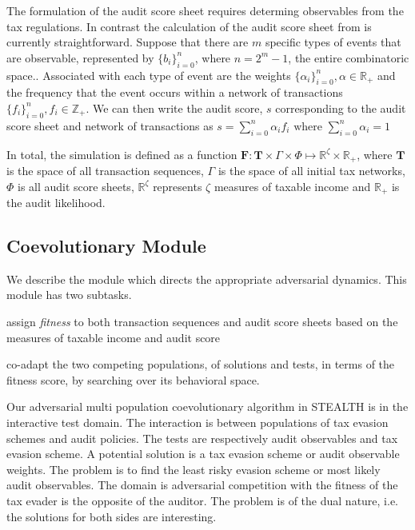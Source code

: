 The formulation of the audit score sheet requires determing
observables from the tax regulations. In contrast the calculation of
the audit score sheet from is currently straightforward. Suppose that
there are $m$ specific types of events that are observable,
represented by $\{b_i\}_{i=0}^n$, where $n = 2^m - 1$, the entire
combinatoric space.. Associated with each type of event are the
weights $\{\alpha_i\}_{i=0}^n, \alpha \in \mathbb{R}_+$ and the
frequency that the event occurs within a network of transactions
$\{f_i\}_{i=0}^n, f_i \in \mathbb{Z}_+$. We can then write the audit
score, $s$ corresponding to the audit score sheet and network of
transactions as $s = \sum_{i=0}^n \alpha_i f_i \text{ where }
\sum_{i=0}^n \alpha_i = 1$

In total, the simulation is defined as a function $\textbf{F} :
\textbf{T} \times \Gamma \times \Phi \mapsto \mathbb{R}^{\zeta} \times
\mathbb{R}_+$, where $\textbf{T}$ is the space of all transaction
sequences, $\Gamma$ is the space of all initial tax networks, $\Phi$
is all audit score sheets, $\mathbb{R}^{\zeta}$ represents $\zeta$
measures of taxable income and $\mathbb{R}_+$ is the audit likelihood.

\subsection{Coevolutionary Module}
\label{sec:optimization}

We describe the module which directs the appropriate adversarial
dynamics. This module has two subtasks.
\begin{inparaenum}[\itshape A)]
\item assign \textit{fitness} to both transaction sequences and audit
  score sheets based on the measures of taxable income and audit
  score
\item co-adapt the two competing populations, of solutions and tests,
  in terms of the fitness score, by searching over its behavioral
  space.
\end{inparaenum}

Our adversarial multi population coevolutionary algorithm in STEALTH
is in the interactive test
domain\citep{popovici2012coevolutionary}. The interaction is between
populations of tax evasion schemes and audit policies. The tests are
respectively audit observables and tax evasion scheme. A potential
solution is a tax evasion scheme or audit observable weights.  The
problem is to find the least risky evasion scheme or most likely audit
observables. The domain is adversarial competition with the fitness of
the tax evader is the opposite of the auditor. The problem is of the
dual nature, i.e. the solutions for both sides are interesting.



